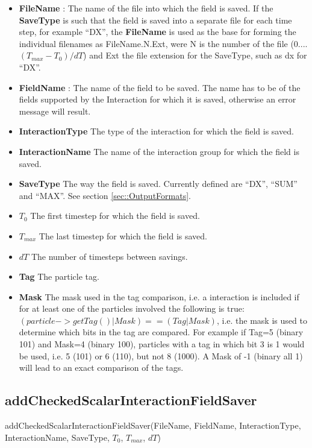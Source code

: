 \documentclass{report}
\begin{document}
\begin{itemize}
\item \textbf{FileName} : The name of the file into which the field is saved. If the  \textbf{SaveType} is such that the field is saved into a separate file for each time step, for example ``DX'', the \textbf{FileName} is used as the base for forming the individual filenames as FileName.N.Ext, were N is the number of the file (0....$(T_{max}-T_0)/dT$) and Ext the file extension for the SaveType, such as dx for ``DX''.
\item \textbf{FieldName} : The name of the field to be saved. The name has to be of the fields supported by the Interaction for which it is saved, otherwise an error message will result.
\item \textbf{InteractionType} The type of the interaction for which the field is saved.
\item \textbf{InteractionName} The name of the interaction group for which the field is saved.
\item \textbf{SaveType} The way the field is saved. Currently defined are ``DX'', ``SUM'' and ``MAX''. See section \ref{sec::OutputFormats}.
\item \textbf{$T_0$} The first timestep for which the field is saved.
\item \textbf{$T_{max}$} The last timestep for which the field is saved.
\item \textbf{$dT$} The number of timesteps between savings. 
\item \textbf{Tag} The particle tag.
\item \textbf{Mask} The mask used in the tag comparison, i.e. a interaction is included if for at least one of the particles involved the following is true: $(particle->getTag() | Mask ) == (Tag | Mask)$, i.e. the mask is used to determine which bits in the tag are compared. For example if Tag=5 (binary 101) and Mask=4 (binary 100), particles with a tag in which bit 3 is 1 would be used, i.e. 5 (101) or 6 (110), but not 8 (1000). A Mask of -1 (binary all 1) will lead to an exact comparison of the tags.     
\end{itemize}

\subsection{addCheckedScalarInteractionFieldSaver}

\textsf{addCheckedScalarInteractionFieldSaver(FileName, FieldName, InteractionType, InteractionName, SaveType, $T_0$, $T_{max}$, $dT$)}
\par \medskip
\end{document}
